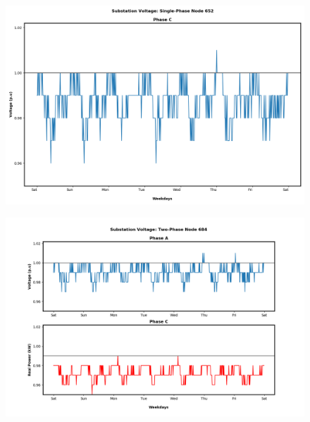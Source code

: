 \begin{figure}[H]
    \centering
    \includegraphics[width=1.1\columnwidth]{Pictures/sixty_single_phase_652_volt.png}
    \caption{ }
\end{figure}

\newpage

\begin{figure}[H]
    \centering
    \includegraphics[width=1.1\columnwidth]{Pictures/sixty_two_phase_684_volt.png}
    \caption{ }
\end{figure}

\newpage

